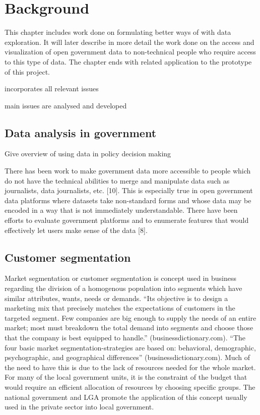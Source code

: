 \chapter{Background} \label{ch:background}
This chapter includes work done on formulating better ways of with data exploration. It will later describe in more detail the work done on the access and visualization of open government data to non-technical people who require access to this type of data. The chapter ends with related application to the prototype of this project.\par

incorporates all relevant issues\par
main issues are analysed and developed\par

\section{Data analysis in government}
Give overview of using data in policy decision making\par
 
There has been work to make government data more accessible to people which do not have the technical abilities to merge and manipulate data such as journalists, data journalists, etc. [10]. This is especially true in open government data platforms where datasets take non-standard forms and whose data may be encoded in a way that is not immediately understandable. There have been efforts to evaluate government platforms and to enumerate features that would effectively let users make sense of the data [8].

\section{Customer segmentation}
Market segmentation or customer segmentation is concept used in business regarding the division of a homogenous population into segments which have similar attributes, wants, needs or demands. “Its objective is to design a marketing mix that precisely matches the expectations of customers in the targeted segment. Few companies are big enough to supply the needs of an entire market; most must breakdown the total demand into segments and choose those that the company is best equipped to handle.” (businessdictionary.com). “The four basic market segmentation-strategies are based on: behavioral, demographic, psychographic, and geographical differences” (businessdictionary.com). Much of the need to have this is due to the lack of resources needed for the whole market. For many of the local government units, it is the constraint of the budget that would require an efficient allocation of resources by choosing specific groups. The national government and LGA promote the application of this concept usually used in the private sector into local government.\par
 

